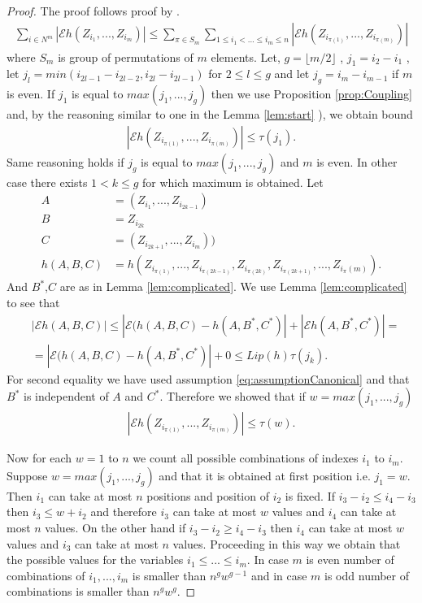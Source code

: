 \documentclass{article} %
\newcommand{\ev}{\mathcal{E}}
\begin{document}
\begin{proof}
 The proof follows proof by \cite[Lemma 3]{arcones1998law}. 
\begin{align}
 \sum_{i \in N^{m}} |\ev   h(Z_{i_1},...,Z_{i_m})| \leq \sum_{\pi \in S_m} \sum_{1 \leq i_1< ...\leq i_m \leq n} |\ev   h(Z_{i_{\pi(1)}},...,Z_{i_{\pi(m)}})|
\end{align}
where $S_m$ is group of permutations of $m$ elements.  Let, $g=\lfloor m/2 \rfloor$ , $j_1 = i_2 - i_1$ , let $j_l = min(i_{2l-1} - i_{2l-2} , i_{2l} - i_{2l-1} )$ for $2 \leq l \leq g$  and let $j_g = i_m - i_{m-1}$ if $m$ is even. If $j_1$ is equal to $max(j_1,...,j_g)$ then we use Proposition \ref{prop:Coupling} and, by the reasoning similar to one in the  Lemma \ref{lem:start} ), we obtain bound
 \begin{align}
  |\ev   h(Z_{i_{\pi(1)}},...,Z_{i_{\pi(m)}})| \leq \tau(j_1). 
 \end{align}
Same reasoning holds if $j_g$ is equal to $max(j_1,...,j_g)$ and $m$ is even. In other case there exists $1 < k \leq g$ for which maximum is obtained. Let
\begin{align}
A &= (Z_{i_1},...,Z_{i_{2k-1}}) \\
B &= Z_{i_{2k}} \\
C &= (Z_{i_{2k+1}},...,Z_{i_m}) )\\
h(A,B,C) &= h(Z_{i_{\pi(1)}},...,Z_{i_{\pi(2k-1)}},Z_{i_{\pi(2k)}},Z_{i_{\pi(2k+1)}},...,Z_{i_\pi(m)}).
\end{align}
And $B^*$,$C$ are as in Lemma \ref{lem:complicated}. We use Lemma \ref{lem:complicated} to see that 
\begin{align}
&  |\ev   h(A,B,C)| \leq | \ev ( h(A,B,C) -  h(A,B^*,C^*)| +  |\ev h(A,B^*,C^*)| = \\
&= | \ev ( h(A,B,C) -  h(A,B^*,C^*)| + 0  \leq Lip(h)  \tau(j_k).
\end{align}
For second equality we have used assumption \ref{eq:assumptionCanonical} and that $B^*$ is independent of $A$ and $C^*$. Therefore we showed that if $w=max(j_1,...,j_g)$
\begin{align}
| \ev h(Z_{i_{\pi(1)}},...,Z_{i_{\pi(m)}}) | \leq \tau(w).
\end{align}

Now for each $w=1$ to $n$ we count all possible combinations of indexes $i_1$ to $i_m$. Suppose $w=max(j_1,...,j_g)$ and that it is obtained at first position i.e. $j_1=w$. Then $i_1$ can take at most $n$ positions and position of $i_2$ is fixed. If $i_3-i_2 \leq i_4- i_3$ then $i_3 \leq w +i_2$ and therefore $i_3$ can take at most $w$ values and $i_4$ can take at most $n$ values. On the other hand if  $i_3-i_2 \geq i_4- i_3$ then $i_4$ can take at most $w$ values and $i_3$ can take at most $n$ values. Proceeding in this way we obtain that the possible values for the variables $i_1 \leq ... \leq i_m$. In case $m$ is even number of combinations of $i_1,...,i_m$ is smaller than $n^{g}w^{g-1}$ and in case $m$ is odd number of combinations is smaller than $n^g w^{g}$. 


\end{proof}
\end{document}
